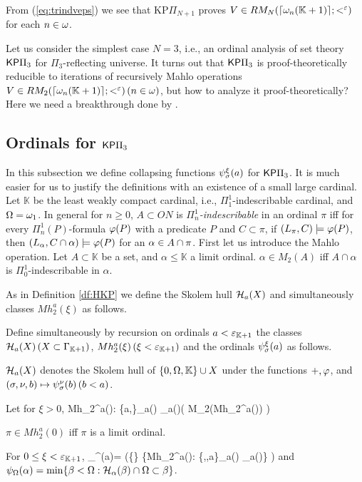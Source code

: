 \documentclass{article}
\newcommand{\mK}{\mathbb{K}}
\begin{document}
From (\ref{eq:trindveps}) we see that {\sf KP}$\Pi_{N+1}$ proves $V\in RM_{N}(\lceil\omega_{n}(\mathbb{K}+1)\rceil;<^{\varepsilon})$
for each $n\in\omega$.



Let us consider the simplest case $N=3$, i.e., an ordinal analysis of 
set theory ${\sf KP}\Pi_{3}$ for $\Pi_{3}$-reflecting universe.
It turns out that ${\sf KP}\Pi_{3}$ is proof-theoretically reducible to
iterations of recursively Mahlo operations
$V\in RM_{2}(\lceil\omega_{n}(\mathbb{K}+1)\rceil;<^{\varepsilon})\, (n\in\omega)$,
but how to analyze it proof-theoretically?
Here we need a breakthrough done by \cite{Rathjen94}.

\subsection{Ordinals for ${\sf KP}\Pi_{3}$}

In this subsection we define collapsing functions $\psi_{\sigma}^{\xi}(a)$ for ${\sf KP}\Pi_{3}$.
It is much easier for us to justify the definitions with an existence of a small large cardinal.
Let $\mathbb{K}$ be the least weakly compact cardinal, i.e., $\Pi^{1}_{1}$-indescribable
cardinal, and $\Omega=\omega_{1}$.
In general for $n\geq 0$, $A\subset ON$ is \textit{$\Pi^{1}_{n}$-indescribable} in an ordinal $\pi$
iff for every $\Pi^{1}_{n}(P)$-formula $\varphi(P)$ with a predicate $P$ and $C\subset\pi$,
if $(L_{\pi},C)\models\varphi(P)$, then
$(L_{\alpha},C\cap\alpha)\models\varphi(P)$ for an $\alpha\in A\cap\pi$.
First let us introduce the Mahlo operation.
Let $A\subset\mathbb{K}$ be a set, and $\alpha\leq\mathbb{K}$ a limit ordinal.
$\alpha\in M_{2}(A)$ iff $A\cap\alpha$ is $\Pi^{1}_{0}$-indescribable in $\alpha$.



As in Definition \ref{df:HKP} we define the Skolem hull ${\cal H}_{a}(X)$ and
simultaneously classes $Mh_{2}^{a}(\xi)$ as follows.

\bdf\label{df:HKPpi3}
{\rm
Define simultaneously by recursion on ordinals $a<\veps_{\mK+1}$ the classes
 $\calh_{a}(X)\, (X\subset \Gam_{\mK+1})$, $Mh_{2}^{a}(\xi)\,(\xi<\veps_{\mK+1})$ and the ordinals $\psi_{\sigma}^{\xi}(a)$ as follows.

\benu
\item
${\cal H}_{a}(X)$ denotes the Skolem hull of $\{0,\Ome,\mK\}\cup X$ under the functions
$+, \varphi$, and
$(\sigma,\nu,b)\mapsto\psi_{\sigma}^{\nu}(b)\, (b<a)$.

\item
Let for $\xi>0$,
\beqn\label{eq:Mh2}
\pi\in Mh_{2}^{a}(\xi):\Lrarw
\{a,\xi\}\subset\calh_{a}(\pi) \spand
\fal\nu\in\calh_{a}(\pi)\cap\xi\left(
\pi\in M_{2}(Mh_{2}^{a}(\nu))
\right)
\eeqn

$\pi\in Mh_{2}^{a}(0)$ iff $\pi$ is a limit ordinal.

\item
For $0\leq\xi<\veps_{\mK+1}$,
\beqn\label{eq:psiPi3}
\psi_{\pi}^{\xi}(a)=
\min\left(\{\pi\}\cup
\{\kap\in Mh_{2}^{a}(\xi): \{\xi,\pi,a\}\subset\calh_{a}(\kap) \spand
\calh_{a}(\kap)\cap\pi\subset\kap\}
\right)
\eeqn
and
$\psi_{\Omega}(\alpha)=\min\{\beta<\Omega:  {\cal H}_{\alpha}(\beta)\cap\Omega\subset \beta\}$.
\eenu
}
\edf
\end{document}
